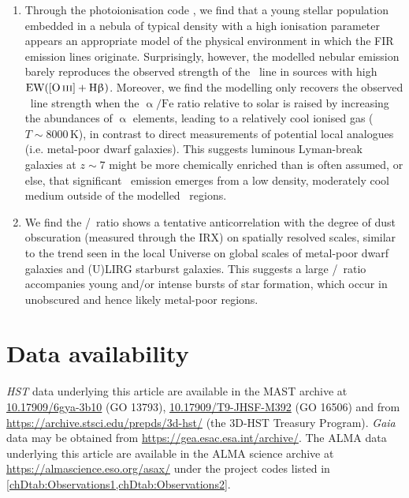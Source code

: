 \begin{enumerate}[label=(\roman*)]
    \item Through the photoionisation code , we find that a young stellar population embedded in a nebula of typical density with a high ionisation parameter appears an appropriate model of the physical environment in which the FIR emission lines originate. Surprisingly, however, the modelled nebular emission barely reproduces the observed strength of the \OIIILam\ line in sources with high $\text{EW} ( \OIIIf + \Hbeta )$. Moreover, we find the  modelling only recovers the observed \OIIILam\ line strength when the $\mathrm{\upalpha/Fe}$ ratio relative to solar is raised by increasing the abundances of $\upalpha$ elements, leading to a relatively cool ionised gas ($T \sim \num{8000} \, \mathrm{K}$), in contrast to direct measurements of potential local analogues (i.e. metal-poor dwarf galaxies). This suggests luminous Lyman-break galaxies at $z \sim 7$ might be more chemically enriched than is often assumed, or else, that significant \OIIILam\ emission emerges from a low density, moderately cool medium outside of the modelled \HII\ regions.
    
    \item We find the \OIIIf/\CII\ ratio shows a tentative anticorrelation with the degree of dust obscuration (measured through the IRX) on spatially resolved scales, similar to the trend seen in the local Universe on global scales of metal-poor dwarf galaxies and (U)LIRG starburst galaxies. This suggests a large \OIIIf/\CII\ ratio accompanies young and/or intense bursts of star formation, which occur in unobscured and hence likely metal-poor regions.
\end{enumerate}

\section*{Data availability}

\textit{HST} data underlying this article are available in the MAST archive at \href{https://dx.doi.org/10.17909/6gya-3b10}{10.17909/6gya-3b10} (GO 13793), \href{https://dx.doi.org/10.17909/t9-jhsf-m392}{10.17909/T9-JHSF-M392} (GO 16506) and from \url{https://archive.stsci.edu/prepds/3d-hst/} (the 3D-HST Treasury Program). \textit{Gaia} data may be obtained from \url{https://gea.esac.esa.int/archive/}. The ALMA data underlying this article are available in the ALMA science archive at \url{https://almascience.eso.org/asax/} under the project codes listed in \cref{chDtab:Observations1,chDtab:Observations2}.

